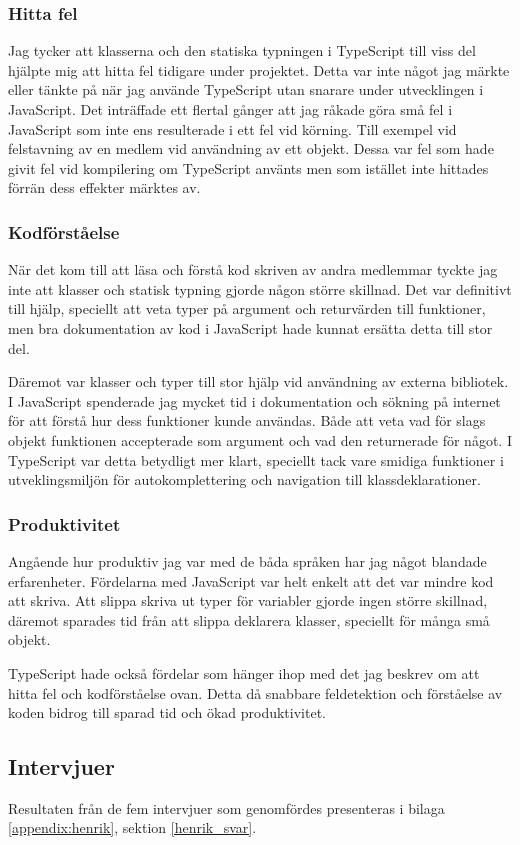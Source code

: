 \subsubsection{Hitta fel}
Jag tycker att klasserna och den statiska typningen i TypeScript till viss del hjälpte mig att hitta fel tidigare under projektet. Detta var inte något jag märkte eller tänkte på när jag använde TypeScript utan snarare under utvecklingen i JavaScript. Det inträffade ett flertal gånger att jag råkade göra små fel i JavaScript som inte ens resulterade i ett fel vid körning. Till exempel vid felstavning av en medlem vid användning av ett objekt. Dessa var fel som hade givit fel vid kompilering om TypeScript använts men som istället inte hittades förrän dess effekter märktes av.
\subsubsection{Kodförståelse}
När det kom till att läsa och förstå kod skriven av andra medlemmar tyckte jag inte att klasser och statisk typning gjorde någon större skillnad. Det var definitivt till hjälp, speciellt att veta typer på argument och returvärden till funktioner, men bra dokumentation av kod i JavaScript hade kunnat ersätta detta till stor del.

Däremot var klasser och typer till stor hjälp vid användning av externa bibliotek. I JavaScript spenderade jag mycket tid i dokumentation och sökning på internet för att förstå hur dess funktioner kunde användas. Både att veta vad för slags objekt funktionen accepterade som argument och vad den returnerade för något. I TypeScript var detta betydligt mer klart, speciellt tack vare smidiga funktioner i utveklingsmiljön för autokomplettering och navigation till klassdeklarationer.
\subsubsection{Produktivitet}
Angående hur produktiv jag var med de båda språken har jag något blandade erfarenheter. Fördelarna med JavaScript var helt enkelt att det var mindre kod att skriva. Att slippa skriva ut typer för variabler gjorde ingen större skillnad, däremot sparades tid från att slippa deklarera klasser, speciellt för många små objekt.

TypeScript hade också fördelar som hänger ihop med det jag beskrev om att hitta fel och kodförståelse ovan. Detta då snabbare feldetektion och förståelse av koden bidrog till sparad tid och ökad produktivitet. 
\subsection{Intervjuer}
Resultaten från de fem intervjuer som genomfördes presenteras i bilaga \ref{appendix:henrik}, sektion \ref{henrik_svar}. 
